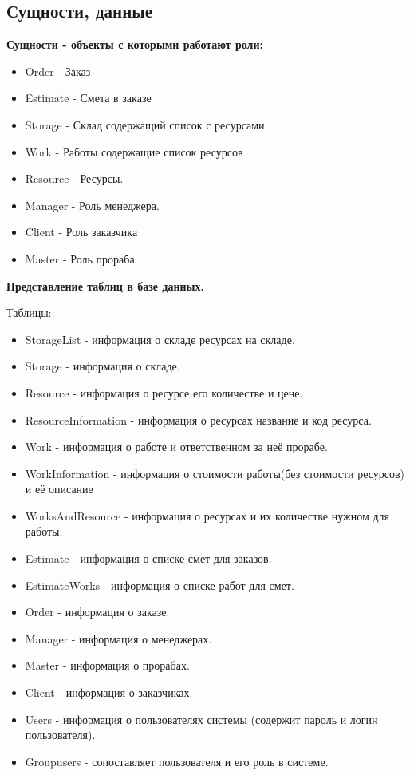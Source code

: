 \subsection{Сущности, данные}
\textbf{Сущности - объекты с которыми работают роли:}

\begin{itemize}
\item Order - Заказ
\item Estimate - Смета в заказе
\item Storage - Склад содержащий список с ресурсами.
\item Work - Работы содержащие список ресурсов
\item Resource - Ресурсы.
\end{itemize}

\begin{itemize}
\item Manager - Роль менеджера.
\item Client - Роль заказчика
\item Master - Роль прораба
\end{itemize}

\textbf{Представление таблиц в базе данных.}

Таблицы:
\begin{itemize}
\item StorageList - информация о складе ресурсах на складе.
\item Storage - информация о складе.
\item Resource - информация о ресурсе его количестве и цене.
\item ResourceInformation - информация о ресурсах название и код ресурса.
\item Work - информация о работе и ответственном за неё прорабе.
\item WorkInformation - информация о стоимости работы(без стоимости ресурсов) и её описание
\item WorksAndResource - информация о ресурсах и их количестве нужном для работы.
\item Estimate - информация о списке смет для заказов.
\item EstimateWorks - информация о списке работ для смет.
\item Order - информация о заказе.
\item Manager - информация о менеджерах.
\item Master - информация о прорабах.
\item Client - информация о заказчиках.
\item Users - информация о пользователях системы (содержит пароль и логин пользователя).
\item Groupusers - сопоставляет пользователя и его роль в системе.
\end{itemize}


